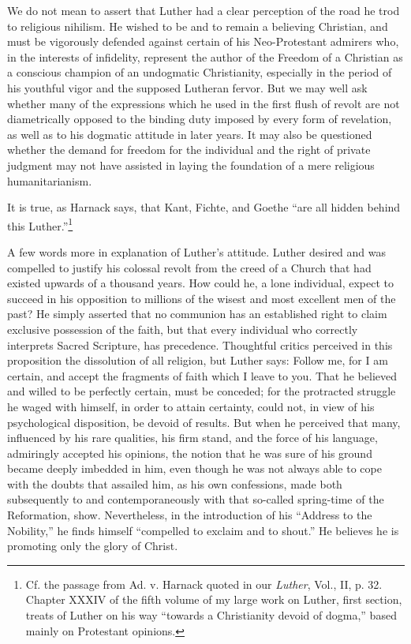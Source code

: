 We do not mean to assert that Luther had a clear perception of the
road he trod to religious nihilism. He wished to be and to remain a
believing Christian, and must be vigorously defended against certain
of his Neo-Protestant admirers who, in the interests of infidelity,
represent the author of the Freedom of a Christian as a conscious
champion of an undogmatic Christianity, especially in the period of
his youthful vigor and the supposed Lutheran fervor. But we may
well ask whether many of the expressions which he used in the
first flush of revolt are not diametrically opposed to the binding duty
imposed by every form of revelation, as well as to his dogmatic attitude
in later years. It may also be questioned whether the demand for
freedom for the individual and the right of private judgment may
not have assisted in laying the foundation of a mere religious humanitarianism.

It is true, as Harnack says, that Kant, Fichte, and Goethe “are all
hidden behind this Luther.”\footnote
{Cf. the passage from Ad. v. Harnack quoted in our \textit{Luther}, Vol., II, p. 32. Chapter
XXXIV of the fifth volume of my large work on Luther, first section, treats of Luther on
his way “towards a Christianity devoid of dogma,” based mainly on Protestant opinions.}

A few words more in explanation of Luther’s attitude. Luther
desired and was compelled to justify his colossal revolt from the creed
of a Church that had existed upwards of a thousand years. How could
he, a lone individual, expect to succeed in his opposition to millions
of the wisest and most excellent men of the past? He simply asserted
that no communion has an established right to claim exclusive possession
of the faith, but that every individual who correctly interprets
Sacred Scripture, has precedence. Thoughtful critics perceived
in this proposition the dissolution of all religion, but Luther says:
Follow me, for I am certain, and accept the fragments of faith which
I leave to you. That he believed and willed to be perfectly certain,
must be conceded; for the protracted struggle he waged with himself,
in order to attain certainty, could not, in view of his psychological
disposition, be devoid of results. But when he perceived that many,
influenced by his rare qualities, his firm stand, and the force of his
language, admiringly accepted his opinions, the notion that he was
sure of his ground became deeply imbedded in him, even though
he was not always able to cope with the doubts that assailed him, as
his own confessions, made both subsequently to and contemporaneously with
that so-called spring-time of the Reformation, show.
Nevertheless, in the introduction of his “Address to the Nobility,”
he finds himself “compelled to exclaim and to shout.” He believes he
is promoting only the glory of Christ.

